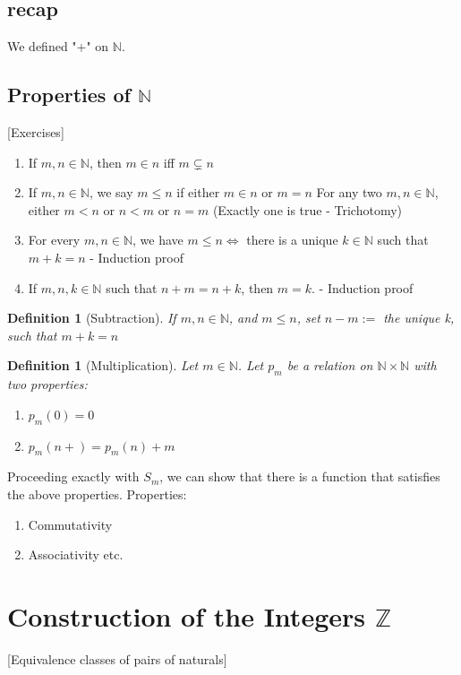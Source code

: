 \documentclass[twoside]{article}
\newcommand{\N}{\mathbb{N}}
\newcommand{\Z}{\mathbb{Z}}
\newtheorem{definition}[theorem]{Definition}
\begin{document}
    \subsection{recap}
    We defined "+" on $\N$.
    
    \subsection{Properties of $\N$} [Exercises]

    \begin{enumerate}
        \item If $m, n \in \N$, then $m \in n$ iff $m \subsetneq n$
        \item If $m, n \in \N$, we say $m \leq n$ if either $m \in n$ or $m = n$
        For any two $m,n \in \N$, either $m < n $ or $n < m$ or $n = m$ (Exactly one is true - Trichotomy)
        \item For every $m,n \in \N$, we have $m \leq n \iff $ there is a unique $k \in \N$ such that $m+k = n$ - Induction proof
        \item If $m,n,k \in \N$ such that $n+m = n+k$, then $m = k$.  - Induction proof 
    \end{enumerate}

    \begin{definition}[Subtraction]
        If $m, n \in \N$, and $m \leq n$, set $n - m := $ the unique k, such that $m + k = n$
    \end{definition}

    \begin{definition}[Multiplication]
        Let $m \in \N$. Let $p_m$ be a relation on $\N \times \N$ with two properties: 
        \begin{enumerate}
            \item $p_m(0) = 0$
            \item $p_m(n+) = p_m(n) + m$
        \end{enumerate}
    \end{definition}

    Proceeding exactly with $S_m$, we can show that there is a function that satisfies the above properties. 
    Properties: 
    \begin{enumerate}
        \item Commutativity
        \item Associativity etc. 
    \end{enumerate}

    \section{Construction of the Integers $\Z$}[Equivalence classes of pairs of naturals]
\end{document}

